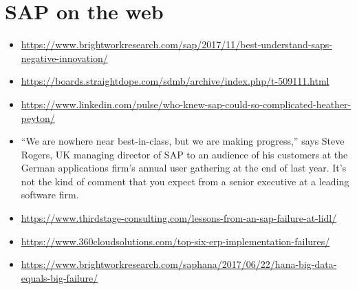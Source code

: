 \documentclass[letterpaper,10pt,english]{sphinxmanual}
\begin{document}
\chapter{SAP on the web}
\label{BusinessProcessReengineering:id16}\begin{itemize}
\item {} 
\href{https://www.brightworkresearch.com/sap/2017/11/best-understand-saps-negative-innovation/}{https://www.brightworkresearch.com/sap/2017/11/best-understand-saps-negative-innovation/}

\item {} 
\href{https://boards.straightdope.com/sdmb/archive/index.php/t-509111.html}{https://boards.straightdope.com/sdmb/archive/index.php/t-509111.html}

\item {} 
\href{https://www.linkedin.com/pulse/who-knew-sap-could-so-complicated-heather-peyton/}{https://www.linkedin.com/pulse/who-knew-sap-could-so-complicated-heather-peyton/}

\item {} 
``We are nowhere near best-in-class, but we are making progress,'' says
Steve Rogers, UK managing director of SAP to an audience of his
customers at the German applications firm's annual user gathering at
the end of last year. It's not the kind of comment that you expect
from a senior executive at a leading software firm.

\item {} 
\href{https://www.thirdstage-consulting.com/lessons-from-an-sap-failure-at-lidl/}{https://www.thirdstage-consulting.com/lessons-from-an-sap-failure-at-lidl/}

\item {} 
\href{https://www.360cloudsolutions.com/top-six-erp-implementation-failures/}{https://www.360cloudsolutions.com/top-six-erp-implementation-failures/}

\item {} 
\href{https://www.brightworkresearch.com/saphana/2017/06/22/hana-big-data-equals-big-failure/}{https://www.brightworkresearch.com/saphana/2017/06/22/hana-big-data-equals-big-failure/}

\end{itemize}
\end{document}
